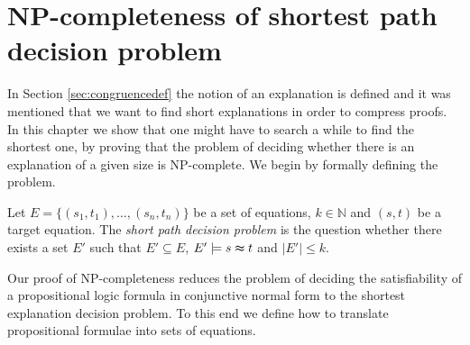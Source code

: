 \section*{NP-completeness of shortest path decision problem}
\label{sec:npcomplete}
In Section \ref{sec:congruencedef} the notion of an explanation is defined and it was mentioned that we want to find short explanations in order to compress proofs.
In this chapter we show that one might have to search a while to find the shortest one, by proving that the problem of deciding whether there is an explanation of a given size is NP-complete.
We begin by formally defining the problem.

\begin{definition}

Let $E = \{(s_1,t_1),\ldots,(s_n,t_n)\}$ be a set of equations, $k \in \mathbb{N}$ and $(s,t)$ be a target equation.
The \emph{short path decision problem} is the question whether there exists a set $E'$ such that $E' \subseteq E$, $E' \models s \thickapprox t$ and $|E'| \leq k$.

\end{definition}

Our proof of NP-completeness reduces the problem of deciding the satisfiability of a propositional logic formula in conjunctive normal form to the shortest explanation decision problem.
To this end we define how to translate propositional formulae into sets of equations.

